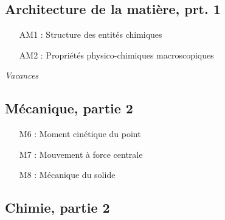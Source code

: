 \documentclass[a4paper, 10pt, final, garamond]{book}
\begin{document}
\setlength{\columnsep}{0cm}

\begin{multicols}{2}
	\subsection{Architecture de la matière, prt. 1}
	\begin{itemize}[label=$\diamond$]
		\item[AM1]: Structure des entités chimiques
		\item[AM2]: Propriétés physico-chimiques macroscopiques
	\end{itemize}

	\begin{center}
		\textit{\Large Vacances}
	\end{center}

	\columnbreak

	\subsection{Mécanique, partie 2}
	\begin{itemize}[label=$\diamond$]
		\item[M6]: Moment cinétique du point
		\item[M7]: Mouvement à force centrale
		\item[M8]: Mécanique du solide
	\end{itemize}
\end{multicols}

\setlength{\columnsep}{-2.5cm}

\subsection{Chimie, partie 2}
\end{document}
